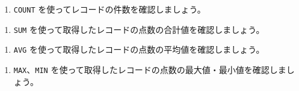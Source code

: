 \begin{enumerate}
\def\labelenumi{\arabic{enumi}.}
\setcounter{enumi}{1}
\tightlist
\item
  \texttt{COUNT} を使ってレコードの件数を確認しましょう。
\end{enumerate}

\begin{Shaded}
\begin{Highlighting}[]
 \NormalTok{(}\OperatorTok{*}\NormalTok{) }
\end{Highlighting}
\end{Shaded}

\begin{enumerate}
\def\labelenumi{\arabic{enumi}.}
\setcounter{enumi}{1}
\tightlist
\item
  \texttt{SUM} を使って取得したレコードの点数の合計値を確認しましょう。
\end{enumerate}

\begin{Shaded}
\begin{Highlighting}[]
 

 \OperatorTok{=} \NormalTok{;}
\end{Highlighting}
\end{Shaded}

\begin{enumerate}
\def\labelenumi{\arabic{enumi}.}
\setcounter{enumi}{2}
\tightlist
\item
  \texttt{AVG} を使って取得したレコードの点数の平均値を確認しましょう。
\end{enumerate}

\begin{Shaded}
\begin{Highlighting}[]
 
\end{Highlighting}
\end{Shaded}

\begin{enumerate}
\def\labelenumi{\arabic{enumi}.}
\setcounter{enumi}{3}
\tightlist
\item
  \texttt{MAX}、\texttt{MIN}
  を使って取得したレコードの点数の最大値・最小値を確認しましょう。
\end{enumerate}


